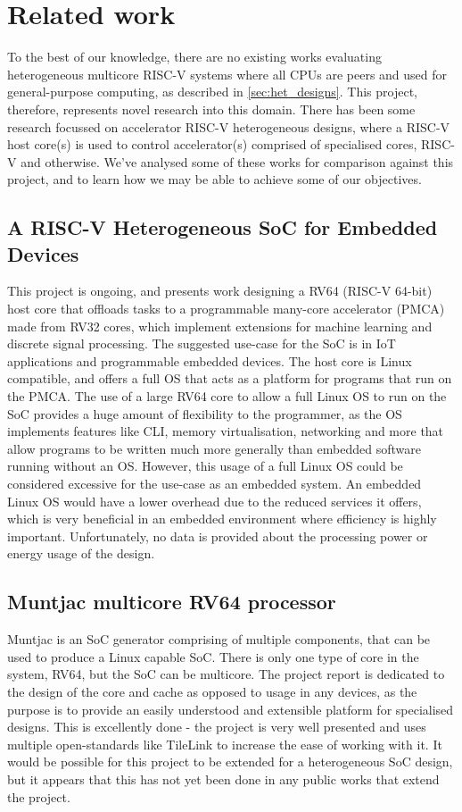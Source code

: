 \section{Related work}
To the best of our knowledge, there are no existing works evaluating heterogeneous multicore RISC-V systems where all CPUs are peers and used for general-purpose computing, as described in \ref{sec:het_designs}. This project, therefore, represents novel research into this domain. There has been some research focussed on accelerator RISC-V heterogeneous designs, where a RISC-V host core(s) is used to control accelerator(s) comprised of specialised cores, RISC-V and otherwise. We've analysed some of these works for comparison against this project, and to learn how we may be able to achieve some of our objectives.

\subsection{A RISC-V Heterogeneous SoC for Embedded Devices\cite{valenterisc}}
This project is ongoing, and presents work designing a RV64 (RISC-V 64-bit) host core that offloads tasks to a programmable many-core accelerator (PMCA) made from RV32 cores, which implement extensions for machine learning and discrete signal processing. The suggested use-case for the SoC is in IoT applications and programmable embedded devices. The host core is Linux compatible, and offers a full OS that acts as a platform for programs that run on the PMCA. The use of a large RV64 core to allow a full Linux OS to run on the SoC provides a huge amount of flexibility to the programmer, as the OS implements features like CLI, memory virtualisation, networking and more that allow programs to be written much more generally than embedded software running without an OS. However, this usage of a full Linux OS could be considered excessive for the use-case as an embedded system. An embedded Linux OS would have a lower overhead due to the reduced services it offers, which is very beneficial in an embedded environment where efficiency is highly important. Unfortunately, no data is provided about the processing power or energy usage of the design.

\subsection{Muntjac multicore RV64 processor\cite{UCAM-CL-TR-972}}
Muntjac is an SoC generator comprising of multiple components, that can be used to produce a Linux capable SoC. There is only one type of core in the system, RV64, but the SoC can be multicore. The project report is dedicated to the design of the core and cache as opposed to usage in any devices, as the purpose is to provide an easily understood and extensible platform for specialised designs. This is excellently done - the project is very well presented and uses multiple open-standards like TileLink\cite{tilelink} to increase the ease of working with it. It would be possible for this project to be extended for a heterogeneous SoC design, but it appears that this has not yet been done in any public works that extend the project.

